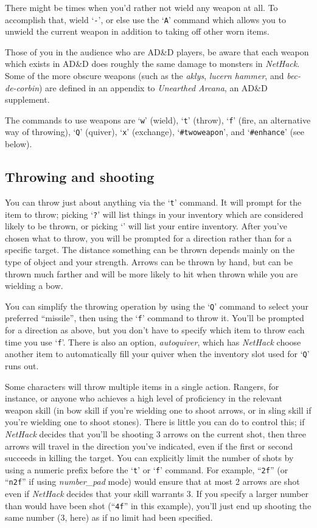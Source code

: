 There might be times when you'd rather not wield any weapon at all.
To accomplish that, wield `{\tt -}', or else use the `{\tt A}' command which
allows you to unwield the current weapon in addition to taking off
other worn items.

Those of you in the audience who are AD\&D players, be aware that each
weapon which exists in AD\&D does roughly the same damage to monsters in
{\it NetHack}.  Some of the more obscure weapons (such as the %
{\it aklys}, {\it lucern hammer}, and {\it bec-de-corbin\/}) are defined
in an appendix to {\it Unearthed Arcana}, an AD\&D supplement.

The commands to use weapons are `{\tt w}' (wield), `{\tt t}' (throw),
`{\tt f}' (fire, an alternative way of throwing), `{\tt Q}' (quiver),
`{\tt x}' (exchange), `{\tt \#twoweapon}', and `{\tt \#enhance}' (see below).

\subsection*{Throwing and shooting}

You can throw just about anything via the `{\tt t}' command.  It will prompt
for the item to throw; picking `{\tt ?}' will list things in your inventory
which are considered likely to be thrown, or picking `{\tt *}' will list
your entire inventory.  After you've chosen what to throw, you will
be prompted for a direction rather than for a specific target.  The
distance something can be thrown depends mainly on the type of object
and your strength.  Arrows can be thrown by hand, but can be thrown
much farther and will be more likely to hit when thrown while you are
wielding a bow.

You can simplify the throwing operation by using the `{\tt Q}' command to
select your preferred ``missile'', then using the `{\tt f}' command to
throw it.  You'll be prompted for a direction as above, but you don't
have to specify which item to throw each time you use `{\tt f}'.  There is
also an option,
{\it autoquiver},
which has {\it NetHack\/} choose another item to automatically fill your
quiver when the inventory slot used for `{\tt Q}' runs out.

Some characters will throw multiple items in a single action.  Rangers,
for instance, or anyone who achieves a high level of proficiency in
the relevant weapon skill (in bow skill if you're wielding one to
shoot arrows, or in sling skill if you're wielding one to shoot stones).
There is little you can do
to control this; if {\it NetHack\/} decides that you'll be shooting 3 arrows
on the current shot, then three arrows will travel in the direction
you've indicated, even if the first or second succeeds in killing the
target.  You can explicitly limit the number of shots by using a numeric
prefix before the `{\tt t}' or `{\tt f}' command.
For example, ``{\tt 2f}'' (or ``{\tt n2f}'' if using
{\it number\_pad\/}
mode) would ensure that at most 2 arrows are shot
even if {\it NetHack\/} decides that your skill warrants 3.  If you specify
a larger number than would have been shot (``{\tt 4f}'' in this example),
you'll just end up shooting the same number (3, here) as if no limit
had been specified.


